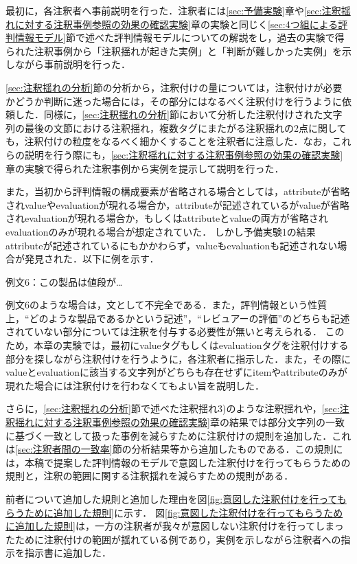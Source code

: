 \documentclass[japanese]{jnlp_1.4}
\begin{document}
最初に，各注釈者へ事前説明を行った．注釈者には\ref{sec:予備実験}章や\ref{sec:注釈揺れに対する注釈事例参照の効果の確認実験}章の実験と同じく\ref{sec:4つ組による評判情報モデル}節で述べた評判情報モデルについての解説をし，過去の実験で得られた注釈事例から「注釈揺れが起きた実例」と「判断が難しかった実例」を示しながら事前説明を行った．

\ref{sec:注釈揺れの分析}節の分析から，注釈付けの量については，注釈付けが必要かどうか判断に迷った場合には，その部分にはなるべく注釈付けを行うように依頼した．同様に，\ref{sec:注釈揺れの分析}節において分析した注釈付けされた文字列の最後の文節における注釈揺れ，複数タグにまたがる注釈揺れの2点に関しても，注釈付けの粒度をなるべく細かくすることを注釈者に注意した．なお，これらの説明を行う際にも，\ref{sec:注釈揺れに対する注釈事例参照の効果の確認実験}章の実験で得られた注釈事例から実例を提示して説明を行った．

また，当初から評判情報の構成要素が省略される場合としては，attributeが省略されvalueやevaluationが現れる場合か，attributeが記述されているがvalueが省略されevaluationが現れる場合か，もしくはattributeとvalueの両方が省略されevaluationのみが現れる場合が想定されていた．
しかし予備実験1の結果attributeが記述されているにもかかわらず，valueもevaluationも記述されない場合が発見された．以下に例を示す．

\vspace*{0.5\baselineskip}
例文6：この製品は値段が…
\vspace*{0.5\baselineskip}

例文6のような場合は，文として不完全である．また，評判情報という性質上，``どのような製品であるかという記述''，``レビュアーの評価''のどちらも記述されていない部分については注釈を付与する必要性が無いと考えられる．
このため，本章の実験では，最初にvalueタグもしくはevaluationタグを注釈付けする部分を探しながら注釈付けを行うように，各注釈者に指示した．また，その際にvalueとevaluationに該当する文字列がどちらも存在せずにitemやattributeのみが現れた場合には注釈付けを行わなくてもよい旨を説明した．

さらに，\ref{sec:注釈揺れの分析}節で述べた注釈揺れ3)のような注釈揺れや，\ref{sec:注釈揺れに対する注釈事例参照の効果の確認実験}章の結果では部分文字列の一致に基づく一致として扱った事例を減らすために注釈付けの規則を追加した．これは\ref{sec:注釈者間の一致率}節の分析結果等から追加したものである．この規則には，本稿で提案した評判情報のモデルで意図した注釈付けを行ってもらうための規則と，注釈の範囲に関する注釈揺れを減らすための規則がある．

前者について追加した規則と追加した理由を図\ref{fig:意図した注釈付けを行ってもらうために追加した規則}に示す．
図\ref{fig:意図した注釈付けを行ってもらうために追加した規則}は，一方の注釈者が我々が意図しない注釈付けを行ってしまったために注釈付けの範囲が揺れている例であり，実例を示しながら注釈者への指示を指示書に追加した．
\end{document}
